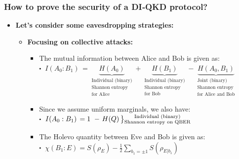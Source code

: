 \documentclass{beamer}
\newcommand\sbullet[1][.5]{\mathbin{\vcenter{\hbox{\scalebox{#1}{$\bullet$}}}}}
\newenvironment{rcases}
  {\left.\begin{aligned}}
  {\end{aligned}\right\rbrace}
\begin{document}
    \begin{frame}
        \frametitle{\large How to prove the security of a DI‑QKD protocol?}

        \vspace{3ex}
        \begin{itemize}
            \item \textbf{Let's consider some eavesdropping strategies:}
            \begin{itemize}
                \item \textbf{Focusing on collective attacks:}
                \begin{itemize}
                    \item The mutual information between Alice and Bob is given as:\\
                    \vspace{0.5ex}
                    $\sbullet$\, $I({A}_{0}:{B}_{1})\, = \underbrace{H({A}_{0})}_{\substack{\text{Individual (binary)}\\ \text{Shannon entropy}\\ \text{for Alice}}} + \underbrace{H({B}_{1})}_{\substack{\text{Individual (binary)}\\ \text{Shannon entropy}\\ \text{for Bob}}} - \underbrace{H({A}_{0},{B}_{1})}_{\substack{\text{Joint (binary)}\\ \text{Shannon entropy}\\ \text{for Alice and Bob}}}$
                    \vspace{0.75ex}
                    \item Since we assume uniform marginals, we also have:\\
                    \vspace{0.5ex}
                    $\sbullet$\, $I({A}_{0}:{B}_{1})\, = 1\ - \begin{rcases}H(Q)\,\end{rcases}\substack{\text{Individual (binary)}\\ \text{Shannon entropy on QBER}}$
                    \vspace{1.5ex}
                    \item The Holevo quantity between Eve and Bob is given as:\\
                    \vspace{0.5ex}
                    $\sbullet$\, $\chi({B}_{1}:E) = S({\rho}_{E}) - \frac{1}{2} \sum_{{b}_{1} = \pm 1} S({\rho}_{E|{b}_{1}})$\\

\end{itemize}
\end{itemize}
\end{itemize}
\end{frame}
\end{document}
